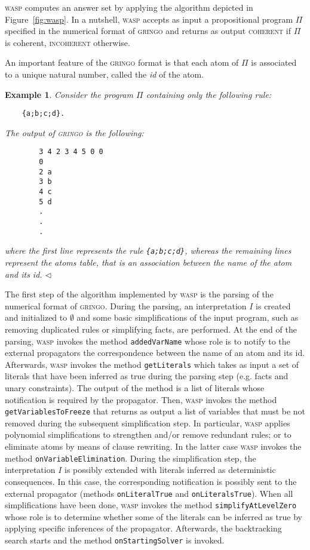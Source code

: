 \documentclass[a4paper,12pt]{article}
\newcommand{\wasp}{\textsc{wasp}\xspace}
\newcommand{\gringo}{\textsc{gringo}\xspace}
\newcommand{\coherent}{\textsc{coherent}\xspace}
\newcommand{\inco}{\textsc{incoherent}\xspace}
\newtheorem{example}{Example}
\begin{document}
	\wasp computes an answer set by applying the algorithm depicted in Figure~\ref{fig:wasp}.
	In a nutshell, \wasp accepts as input a propositional program $\Pi$ specified in the numerical format of \gringo and returns  as output \coherent if $\Pi$ is coherent, \inco otherwise.
	
	An important feature of the \gringo format is that each atom of $\Pi$ is associated to a unique natural number, called the \emph{id} of the atom.
	\begin{example}\label{ex:ex1}
	Consider the program $\Pi$ containing only the following rule:
	\begin{verbatim}
	{a;b;c;d}.
	\end{verbatim}
	The output of \gringo is the following:
	\begin{verbatim}
		3 4 2 3 4 5 0 0
		0
		2 a
		3 b
		4 c
		5 d
		.
		.
		.
	\end{verbatim}
	where the first line represents the rule \verb|{a;b;c;d}|, whereas the remaining lines represent the atoms table, that is an association between the name of the atom and its id. \hfill $\lhd$
	\end{example}
	The first step of the algorithm implemented by \wasp is the parsing of the numerical format of \gringo.
	During the parsing, an interpretation $I$ is created and initialized to $\emptyset$ and some basic simplifications of the input program, such as removing duplicated rules or simplifying facts, are performed.
	At the end of the parsing, \wasp invokes the method \texttt{addedVarName} whose role is to notify to the external propagators the correspondence between the name of an atom and its id.
	Afterwards, \wasp invokes the method \texttt{getLiterals} which takes as input a set of literals that have been inferred as true during the parsing step (e.g. facts and unary constraints). The output of the method is a list of literals whose notification is required by the propagator.
	Then, \wasp invokes the method \texttt{getVariablesToFreeze} that returns as output a list of variables that must be not removed during the subsequent simplification step.
	In particular, \wasp applies polynomial simplifications to strengthen and/or remove redundant rules; or to eliminate atoms by means of clause rewriting.
	In the latter case \wasp invokes the method \texttt{onVariableElimination}.
	During the simplification step, the interpretation $I$ is possibly extended with literals inferred as deterministic consequences.
	In this case, the corresponding notification is possibly sent to the external propagator (methods \texttt{onLiteralTrue} and \texttt{onLiteralsTrue}).
	When all simplifications have been done, \wasp invokes the method \texttt{simplifyAtLevelZero} whose role is to determine whether some of the literals can be inferred as true by applying specific inferences of the propagator.
	Afterwards, the backtracking search starts and the method \texttt{onStartingSolver} is invoked.
\end{document}
